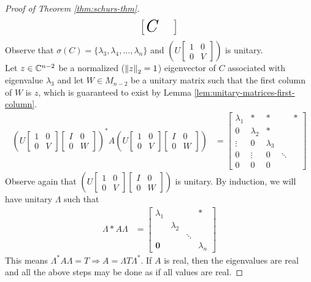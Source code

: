 \begin{proof}[Proof of Theorem \ref{thm:schurs-thm}]
\begin{align*}
\begin{bmatrix}
            \textit{\huge C} & & \end{bmatrix}
\end{align*}
Observe that $\sigma(C) = \{\lambda_3, \lambda_4, \dots, \lambda_n\}$ and $\left(U\begin{bmatrix}1 & 0 \\ 0 & V\end{bmatrix}\right)$ is unitary. \\

\noindent Let $z \in \mathbb C^{n-2}$ be a normalized ($\left\lVert z\right\rVert_2 = 1$) eigenvector of $C$ associated with eigenvalue $\lambda_3$ and let $W \in M_{n-2}$ be a unitary matrix such that the first column of $W$ is $z$, which is guaranteed to exist by Lemma \ref{lem:unitary-matrices-first-column}.
\begin{align*}
    \left(U\begin{bmatrix}1 & 0 \\ 0 & V\end{bmatrix} \begin{bmatrix}I & 0 \\ 0 & W\end{bmatrix}\right)^*
    A
    \left(U\begin{bmatrix}1 & 0 \\ 0 & V\end{bmatrix}
    \begin{bmatrix}I & 0 \\ 0 & W\end{bmatrix}\right) 
    &= \begin{bmatrix} 
        \lambda_1 & * & * & & *\\ 
        0 & \lambda_2 & * & & \\ 
        \vdots & 0 & \lambda_3 & & \\
        0 & \vdots & 0 & \ddots & \\
        0 & 0 & 0 & &
        \end{bmatrix}
\end{align*}
Observe again that $\left(U\begin{bmatrix}1 & 0 \\ 0 & V\end{bmatrix} \begin{bmatrix}I & 0 \\ 0 & W\end{bmatrix}\right)$ is unitary. By induction, we will have unitary $\Lambda$ such that
\begin{align*}
\Lambda* A \Lambda 
    &= \begin{bmatrix}
        \lambda_1 & & & * \\
        & \lambda_2 & & \\
        & & \ddots & \\
        \mathbf{0} & & & \lambda_n
    \end{bmatrix}
\end{align*}
This means $\Lambda^*A\Lambda=T \Longrightarrow A = \Lambda T \Lambda^*$. If $A$ is real, then the eigenvalues are real and all the above steps may be done as if all values are real.
\end{proof}

